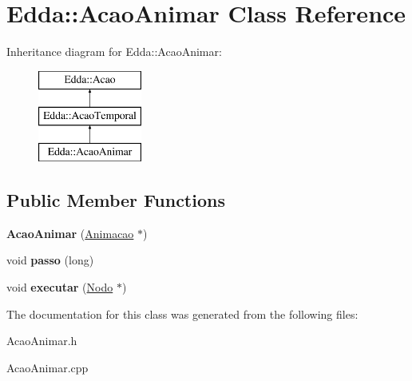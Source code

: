 \hypertarget{class_edda_1_1_acao_animar}{
\section{Edda::AcaoAnimar Class Reference}
\label{class_edda_1_1_acao_animar}
}
Inheritance diagram for Edda::AcaoAnimar:\begin{figure}[H]
\begin{center}
\leavevmode
\includegraphics[height=3.000000cm]{class_edda_1_1_acao_animar}
\end{center}
\end{figure}
\subsection*{Public Member Functions}
\begin{DoxyCompactItemize}
\item 
\hypertarget{class_edda_1_1_acao_animar_a371c98cb4871124349c8b6be1c5a347c}{
{\bfseries AcaoAnimar} (\hyperlink{class_edda_1_1_animacao}{Animacao} $\ast$)}
\label{class_edda_1_1_acao_animar_a371c98cb4871124349c8b6be1c5a347c}

\item 
\hypertarget{class_edda_1_1_acao_animar_a22024ff76d5b145bb4f0497b0f91fcf8}{
void {\bfseries passo} (long)}
\label{class_edda_1_1_acao_animar_a22024ff76d5b145bb4f0497b0f91fcf8}

\item 
\hypertarget{class_edda_1_1_acao_animar_a05b8c14a5d9dd36ca2ddf129e529cfcb}{
void {\bfseries executar} (\hyperlink{class_edda_1_1_nodo}{Nodo} $\ast$)}
\label{class_edda_1_1_acao_animar_a05b8c14a5d9dd36ca2ddf129e529cfcb}

\end{DoxyCompactItemize}


The documentation for this class was generated from the following files:\begin{DoxyCompactItemize}
\item 
AcaoAnimar.h\item 
AcaoAnimar.cpp\end{DoxyCompactItemize}
